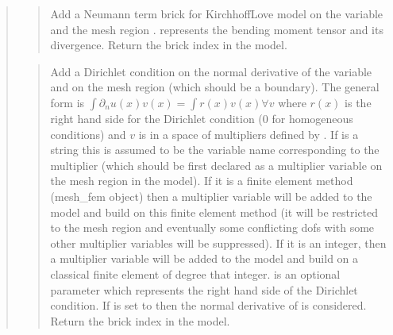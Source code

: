 \documentclass[a4paper,11pt,english]{sphinxmanual}
\begin{document}
\begin{quote}
\begin{quote}
\sphinxAtStartPar
Add a Neumann term brick for Kirchhoff\sphinxhyphen{}Love model
on the variable  and the mesh region .
 represents the bending moment tensor and  
its divergence.
Return the brick index in the model.
\end{quote}

\sphinxAtStartPar
{}
\begin{quote}

\sphinxAtStartPar
Add a Dirichlet condition on the normal derivative of the variable
 and on the mesh region  (which should be a boundary).
The general form is
\(\int \partial_n u(x)v(x) = \int r(x)v(x) \forall v\)
where \(r(x)\) is
the right hand side for the Dirichlet condition (0 for
homogeneous conditions) and \(v\) is in a space of multipliers
defined by .
If  is a string this is assumed
to be the variable name corresponding to the multiplier (which should be
first declared as a multiplier variable on the mesh region in the model).
If it is a finite element method (mesh\_fem object) then a multiplier
variable will be added to the model and build on this finite element
method (it will be restricted to the mesh region  and eventually
some conflicting dofs with some other multiplier variables will be
suppressed). If it is an integer, then a  multiplier variable will be
added to the model and build on a classical finite element of degree
that integer.  is an optional parameter which represents
the right hand side of the Dirichlet condition.
If  is set to  then the normal
derivative of  is considered.
Return the brick index in the model.
\end{quote}

\sphinxAtStartPar
{}
\begin{quote}


\end{quote}
\end{quote}
\end{document}
